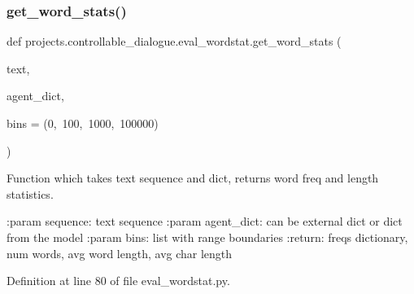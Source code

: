 \mbox{\label{namespaceprojects_1_1controllable__dialogue_1_1eval__wordstat_af8f7aeddab4a5c7f0a5597bdb09f40ae}} 
\subsubsection{\texorpdfstring{get\+\_\+word\+\_\+stats()}{get\_word\_stats()}}
{\footnotesize\ttfamily def projects.\+controllable\+\_\+dialogue.\+eval\+\_\+wordstat.\+get\+\_\+word\+\_\+stats (\begin{DoxyParamCaption}\item[{}]{text,  }\item[{}]{agent\+\_\+dict,  }\item[{}]{bins = {\ttfamily (0,~100,~1000,~100000)} }\end{DoxyParamCaption})}

\begin{DoxyVerb}Function which takes text sequence and dict, returns word freq and length
statistics.

:param sequence: text sequence
:param agent_dict: can be external dict or dict from the model
:param bins: list with range boundaries
:return: freqs dictionary, num words, avg word length, avg char length
\end{DoxyVerb}
 

Definition at line 80 of file eval\+\_\+wordstat.\+py.


